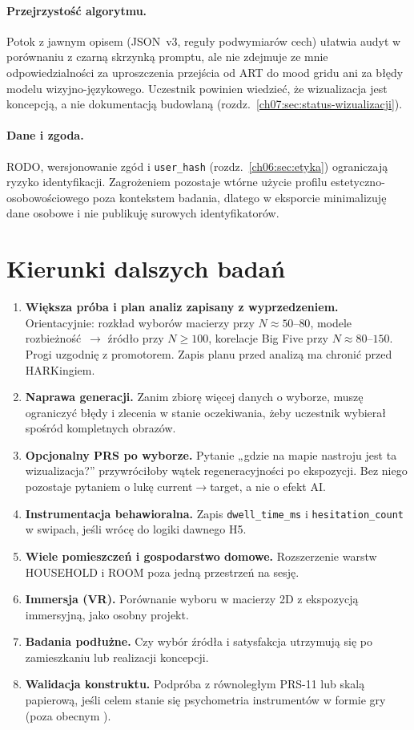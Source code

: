 \paragraph{Przejrzystość algorytmu.}
Potok z jawnym opisem (JSON~v3, reguły podwymiarów cech) ułatwia audyt w porównaniu z czarną skrzynką promptu, ale nie zdejmuje ze mnie odpowiedzialności za uproszczenia przejścia od ART do mood gridu ani za błędy modelu wizyjno-językowego. Uczestnik powinien wiedzieć, że wizualizacja jest koncepcją, a nie dokumentacją budowlaną (rozdz.~\ref{ch07:sec:status-wizualizacji}).

\paragraph{Dane i zgoda.}
RODO, wersjonowanie zgód i \texttt{user\_hash} (rozdz.~\ref{ch06:sec:etyka}) ograniczają ryzyko identyfikacji. Zagrożeniem pozostaje wtórne użycie profilu estetyczno-osobowościowego poza kontekstem badania, dlatego w eksporcie minimalizuję dane osobowe i nie publikuję surowych identyfikatorów.

\section{Kierunki dalszych badań}
\label{ch09:sec:dalsze}

\begin{enumerate}
  \item \textbf{Większa próba i plan analiz zapisany z wyprzedzeniem.} Orientacyjnie: rozkład wyborów macierzy przy $N\!\approx\!50$--$80$, modele rozbieżność~$\rightarrow$ źródło przy $N\!\geq\!100$, korelacje Big Five przy $N\!\approx\!80$--$150$. Progi uzgodnię z promotorem. Zapis planu przed analizą ma chronić przed HARKingiem.
  \item \textbf{Naprawa generacji.} Zanim zbiorę więcej danych o wyborze, muszę ograniczyć błędy i zlecenia w stanie oczekiwania, żeby uczestnik wybierał spośród kompletnych obrazów.
  \item \textbf{Opcjonalny PRS po wyborze.} Pytanie „gdzie na mapie nastroju jest ta wizualizacja?” przywróciłoby wątek regeneracyjności po ekspozycji. Bez niego  pozostaje pytaniem o lukę current$\rightarrow$target, a nie o efekt AI.
  \item \textbf{Instrumentacja behawioralna.} Zapis \texttt{dwell\_time\_ms} i \texttt{hesitation\_count} w swipach, jeśli wrócę do logiki dawnego H5.
  \item \textbf{Wiele pomieszczeń i gospodarstwo domowe.} Rozszerzenie warstw HOUSEHOLD i ROOM poza jedną przestrzeń na sesję.
  \item \textbf{Immersja (VR).} Porównanie wyboru w macierzy 2D z ekspozycją immersyjną, jako osobny projekt.
  \item \textbf{Badania podłużne.} Czy wybór źródła i satysfakcja utrzymują się po zamieszkaniu lub realizacji koncepcji.
  \item \textbf{Walidacja konstruktu.} Podpróba z równoległym PRS-11 lub skalą papierową, jeśli celem stanie się psychometria instrumentów w formie gry (poza obecnym ).
\end{enumerate}

